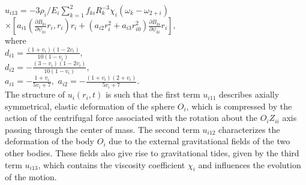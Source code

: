 \documentclass[fontsize = 11pt,a4paper]{article}
\begin{document}
\begin{multicols}{2}
$u_{i13} = -3 \rho_i / E_i \sum\limits_{k=1}^{2} f_{ki} R^{-3}_k \chi_i (\omega_k - \omega_{2+i})$\\
$\times [a_{i1}(\frac{\partial B_{ki}}{\partial \psi_{ki}} r_i, r_i)r_i + (a_{i2}r^2_i +  a_{i3} r^2_{i0}) \frac{\partial B_{ki}}{\partial \psi_{ki}} r_i ], $\\
where\\
$d_{i1} = \frac{(1 + v_i)(1 - 2v_i)}{10(1 - v_i)},$\\
$d_{i2} =- \frac{(3 - v_i)(1 - 2v_i)}{10(1 - v_i)},$\\
$a_{i1} =- \frac{1+ v_i}{5 v_i + 7},$   $a_{i2} =- \frac{(1+ v_i)(2 + v_i)}{5 v_i + 7}. $\\
The structure of $u_i(r_i, t)$ is such that the first term
$u_{i11}$ describes axially symmetrical, elastic deformation
of the sphere $O_i$, which is compressed by the
action of the centrifugal force associated with the
rotation about the $O_iZ_{ii}$ axis passing through the
center of mass. The second term $u_{i12}$ characterizes
the deformation of the body $O_i$ due to the external
gravitational fields of the two other bodies. These
fields also give rise to gravitational tides, given by the
third term $u_{i13}$, which contains the viscosity coefficient
$\chi_i$ and influences the evolution of the motion.


\end{multicols}
\end{document}
